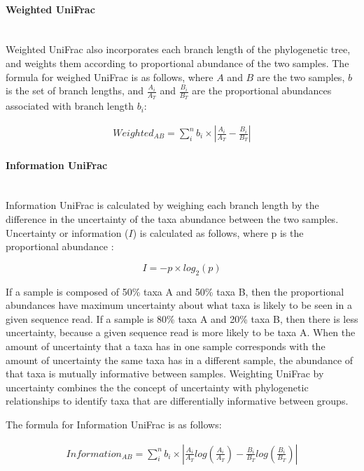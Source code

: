\documentclass[10pt,letterpaper]{article}
\begin{document}
\paragraph{Weighted UniFrac}\mbox{}\\
Weighted UniFrac \cite{lozupone2007quantitative} also incorporates each branch length of the phylogenetic tree, and weights them according to proportional abundance of the two samples. The formula for weighed UniFrac is as follows, where $A$ and $B$ are the two samples, $b$ is the set of branch lengths, and $\frac{A_{i}}{A_{T}}$ and $\frac{B_{i}}{B_{T}}$ are the proportional abundances associated with branch length $b_{i}$:

\begin{align*}
Weighted_{AB} = \sum_{i}^{n} b_{i} \times \left| \frac{A_{i}}{A_{T}} - \frac{B_{i}}{B_{T}} \right|
\end{align*}

\paragraph{Information UniFrac}\mbox{}\\
Information UniFrac is calculated by weighing each branch length by the difference in the uncertainty of the taxa abundance between the two samples. Uncertainty or information ($I$) is calculated as follows, where p is the proportional abundance \cite{shannon2001mathematical}:

\begin{equation}\label{eq:schemeP} 
I = - p  \times log_{2}(p)
\end{equation}

If a sample is composed of 50\% taxa A and 50\% taxa B, then the proportional abundances have maximum uncertainty about what taxa is likely to be seen in a given sequence read. If a sample is 80\% taxa A and 20\% taxa B, then there is less uncertainty, because a given sequence read is more likely to be taxa A. When the amount of uncertainty that a taxa has in one sample corresponds with the amount of uncertainty the same taxa has in a different sample, the abundance of that taxa is mutually informative between samples. Weighting UniFrac by uncertainty combines the the concept of uncertainty with phylogenetic relationships to identify taxa that are differentially informative between groups.

The formula for Information UniFrac is as follows:

\begin{align*}
Information_{AB} = \sum_{i}^{n} b_{i} \times \left| \frac{A_{i}}{A_{T}}log\left(\frac{A_{i}}{A_{T}}\right) - \frac{B_{i}}{B_{T}}log\left(\frac{B_{i}}{B_{T}}\right) \right|
\end{align*}
\end{document}
